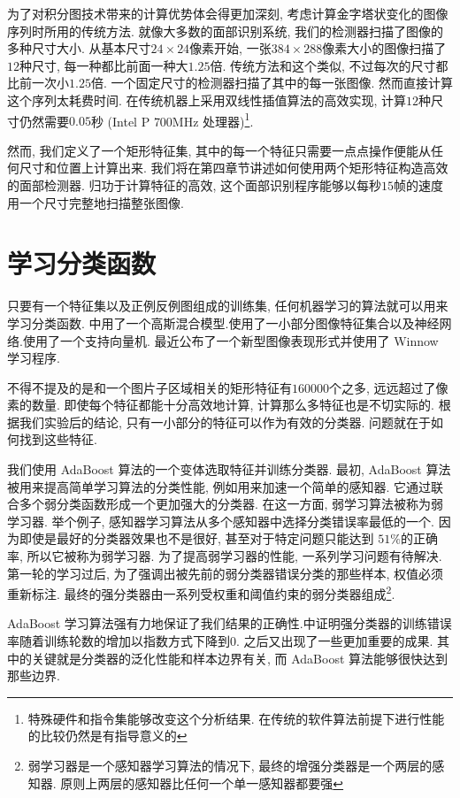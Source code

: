 \documentclass[a4paper,utf8,11pt]{ctexart}
\newcommand{\RN}[1]{%
  \textup{\uppercase\expandafter{\romannumeral#1}}%
}
\begin{document}
为了对积分图技术带来的计算优势体会得更加深刻, 考虑计算金字塔状变化的图像序列时所用的传统方法. 就像大多数的面部识别系统, 我们的检测器扫描了图像的多种尺寸大小. 从基本尺寸$24\times24$像素开始, 一张$384\times288$像素大小的图像扫描了$12$种尺寸, 每一种都比前面一种大$1.25$倍.
传统方法和这个类似, 不过每次的尺寸都比前一次小$1.25$倍. 一个固定尺寸的检测器扫描了其中的每一张图像. 然而直接计算这个序列太耗费时间. 在传统机器上采用双线性插值算法的高效实现, 计算$12$种尺寸仍然需要$0.05$秒 (Intel P\RN{3} 700MHz 处理器)\footnote{特殊硬件和指令集能够改变这个分析结果. 在传统的软件算法前提下进行性能的比较仍然是有指导意义的}.

然而, 我们定义了一个矩形特征集, 其中的每一个特征只需要一点点操作便能从任何尺寸和位置上计算出来. 我们将在第四章节讲述如何使用两个矩形特征构造高效的面部检测器. 归功于计算特征的高效, 这个面部识别程序能够以每秒$15$帧的速度用一个尺寸完整地扫描整张图像.

\section{学习分类函数}\label{sec:learning}
只要有一个特征集以及正例反例图组成的训练集, 任何机器学习的算法就可以用来学习分类函数. \citet{sung1998example}中用了一个高斯混合模型.\citet{rowley1998neural}使用了一小部分图像特征集合以及神经网络.\citet{osuna1997training-2}使用了一个支持向量机. 最近\citet{yang2000snow}公布了一个新型图像表现形式并使用了 Winnow 学习程序.

不得不提及的是和一个图片子区域相关的矩形特征有$160000$个之多, 远远超过了像素的数量. 即使每个特征都能十分高效地计算, 计算那么多特征也是不切实际的. 根据我们实验后的结论, 只有一小部分的特征可以作为有效的分类器. 问题就在于如何找到这些特征.

我们使用 AdaBoost 算法的一个变体选取特征并训练分类器\citep{freund1995desicion}. 最初, AdaBoost 算法被用来提高简单学习算法的分类性能, 例如用来加速一个简单的感知器. 它通过联合多个弱分类函数形成一个更加强大的分类器. 在这一方面, 弱学习算法被称为弱学习器.
举个例子, 感知器学习算法从多个感知器中选择分类错误率最低的一个. 因为即使是最好的分类器效果也不是很好, 甚至对于特定问题只能达到 $51\%$的正确率, 所以它被称为弱学习器.
为了提高弱学习器的性能, 一系列学习问题有待解决. 第一轮的学习过后, 为了强调出被先前的弱分类器错误分类的那些样本, 权值必须重新标注. 最终的强分类器由一系列受权重和阈值约束的弱分类器组成\footnote{弱学习器是一个感知器学习算法的情况下, 最终的增强分类器是一个两层的感知器. 原则上两层的感知器比任何一个单一感知器都要强}.

AdaBoost 学习算法强有力地保证了我们结果的正确性.\citet{schapire1997boosting}中证明强分类器的训练错误率随着训练轮数的增加以指数方式下降到$0$. 之后又出现了一些更加重要的成果. 其中的关键就是分类器的泛化性能和样本边界有关, 而 AdaBoost 算法能够很快达到那些边界.
\end{document}
